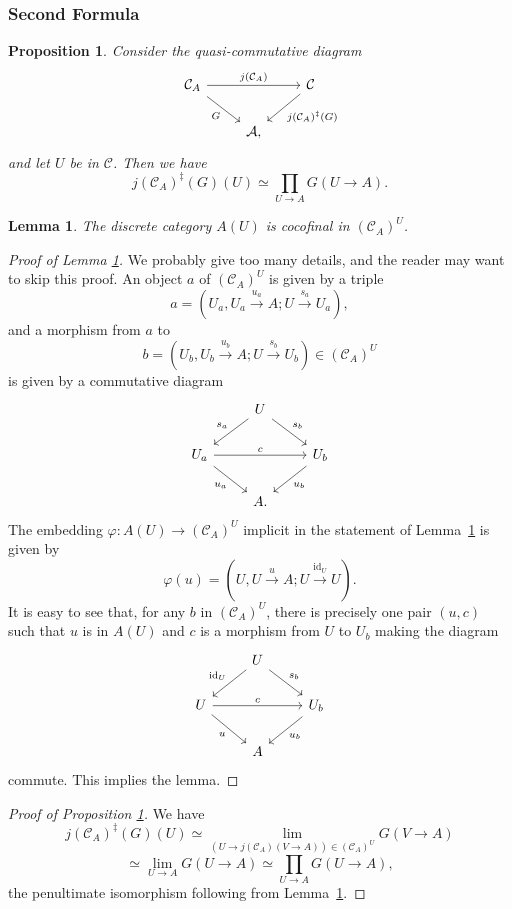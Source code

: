 \documentclass[12pt]{article}%
\newtheorem{lem}[thm]{Lemma}
\newtheorem{prop}[thm]{Proposition}
\theoremstyle{remark}
\theoremstyle{definition}
\newcommand{\A}{\mathcal A}
\newcommand{\C}{\mathcal C}
\newcommand{\pp}{\varphi}
\newcommand{\xr}{\xrightarrow}
\DeclareMathOperator{\id}{id}
\begin{document}
%

\subsubsection{Second Formula}

\begin{prop}\label{prepa2a}
Consider the quasi-commutative diagram 
$$
\begin{tikzcd}
\C_A\ar{rr}{j(\C_A)}\ar{dr}[swap]{G}&&\C\ar{dl}{j(\C_A)^\ddagger(G)}\\ 
{}&\A,
\end{tikzcd}
$$ 
and let $U$ be in $\C$. Then we have 
\begin{equation}\label{prepa2}
j(\C_A)^\ddagger(G)(U)\simeq\prod_{U\to A}G(U\to A).
\end{equation} 
\end{prop}

\begin{lem}\label{cicau}
The discrete category $A(U)$ is cocofinal in $(\C_A)^U$.
\end{lem}

\begin{proof}[Proof of Lemma \ref{cicau}]
We probably give too many details, and the reader may want to skip this proof. An object $a$ of $(\C_A)^U$ is given by a triple 
$$
a=(U_a,U_a\xr{u_a}A;U\xr{s_a}U_a),
$$ 
and a morphism from $a$ to 
$$
b=(U_b,U_b\xr{u_b}A;U\xr{s_b}U_b)\in(\C_A)^U
$$ 
is given by a commutative diagram 
$$
\begin{tikzcd}
{}&U\ar{dl}[swap]{s_a}\ar{dr}{s_b}\\ 
U_a\ar{dr}[swap]{u_a}\ar{rr}{c}&&U_b\ar{dl}{u_b}\\ 
{}&A.
\end{tikzcd}
$$ 
The embedding $\pp:A(U)\to(\C_A)^U$ implicit in the statement of Lemma~\ref{cicau} is given by 
$$
\pp(u)=(U,U\xr uA;U\xr{\id_U}U). 
$$ 
It is easy to see that, for any $b$ in $(\C_A)^U$, there is precisely one pair $(u,c)$ such that $u$ is in $A(U)$ and $c$ is a morphism from $U$ to $U_b$ making the diagram 
$$
\begin{tikzcd}
{}&U\ar{dl}[swap]{\id_U}\ar{dr}{s_b}\\ 
U\ar{dr}[swap]{u}\ar{rr}{c}&&U_b\ar{dl}{u_b}\\ 
{}&A
\end{tikzcd}
$$ 
commute. This implies the lemma. 
\end{proof}

\begin{proof}[Proof of Proposition \ref{prepa2a}]
We have 
$$
j(\C_A)^\ddagger(G)(U)\simeq\lim_{(U\to j(\C_A)(V\to A))\in(\C_A)^U}G(V\to A)
$$
$$
\simeq\lim_{U\to A}G(U\to A)\simeq\prod_{U\to A}G(U\to A),
$$
the penultimate isomorphism following from Lemma~\ref{cicau}. 
\end{proof} 
\end{document}
